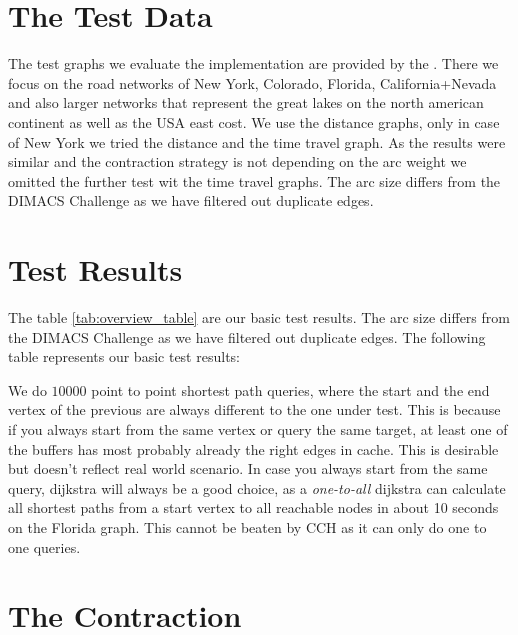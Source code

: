 \section{The Test Data}

The test graphs we evaluate the implementation are provided by the \cite[9th DIMACS Implementation Challenge - Shortest Paths]{DIMACS}. There we focus on the road networks of New York, Colorado, Florida, California+Nevada and also larger networks that represent the great lakes on the north american continent as well as the USA east cost.
We use the distance graphs, only in case of New York we tried the distance and the time travel graph. As the results were similar and the contraction strategy is not depending on the arc weight we omitted the further test wit the time travel graphs.
The arc size differs from the DIMACS Challenge as we have filtered out duplicate edges.

\section{Test Results}

The table \ref{tab:overview_table} are our basic test results. The arc size differs from the DIMACS Challenge as we have filtered out duplicate edges. The following table represents our basic test results:



We do $10000$ point to point shortest path queries, where the start and the end vertex of the previous are always different to the one under test. This is because if you 
always start from the same vertex or query the same target, at least one of the buffers has most probably already the right edges in cache. This is desirable but doesn't reflect real world scenario.
In case you always start from the same query, dijkstra will always be a good choice, as a \textit{one-to-all} dijkstra can calculate all shortest paths from a start vertex to all reachable nodes in about 10 seconds on the Florida graph.
This cannot be beaten by CCH as it can only do one to one queries.

\section{The Contraction}

